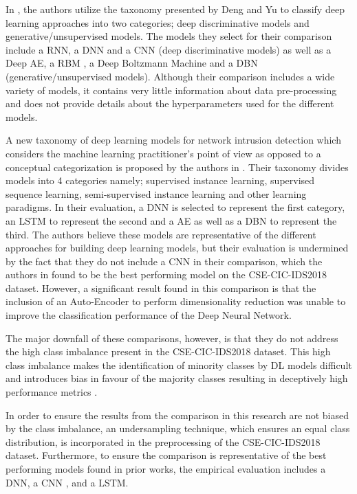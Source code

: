 \documentclass[conference]{IEEEtran}
\begin{document}
In \cite{b13}, the authors utilize the taxonomy presented by Deng and Yu \cite{b23} to classify deep learning approaches into two categories; deep discriminative models and generative/unsupervised models. The models they select for their comparison include a RNN, a DNN and a CNN (deep discriminative models) as well as a Deep AE, a RBM , a Deep Boltzmann Machine and a DBN (generative/unsupervised models). Although their comparison includes a wide variety of models, it contains very little information about data pre-processing and does not provide details about the hyperparameters used for the different models.

A new taxonomy of deep learning models for network intrusion detection which considers the machine learning practitioner’s point of view as opposed to a conceptual categorization is proposed by the authors in \cite{b14}. Their taxonomy divides models into 4 categories namely; supervised instance learning, supervised sequence learning, semi-supervised instance learning and other learning paradigms. In their evaluation, a DNN is selected to represent the first category, an LSTM to represent the second and a AE as well as a DBN to represent the third. The authors believe these models are representative of the different approaches for building deep learning models, but their evaluation is undermined by the fact that they do not include a CNN in their comparison, which the authors in \cite{b13} found to be the best performing model on the CSE-CIC-IDS2018 dataset. However, a significant result found in this comparison is that the inclusion of an Auto-Encoder
to perform dimensionality reduction was unable to improve the classification performance of the Deep Neural Network. 

The major downfall of these comparisons, however, is that they do not address the high class imbalance present in the CSE-CIC-IDS2018 dataset. This high class imbalance makes the identification of minority classes by DL models difficult and introduces bias in favour of the majority classes resulting in deceptively high performance metrics \cite{b17}. 

In order to ensure the results from the comparison in this research are not biased by the class imbalance, an undersampling technique, which ensures an equal class distribution, is incorporated in the preprocessing of the CSE-CIC-IDS2018 dataset. Furthermore, to ensure the comparison is representative of the best performing models found in prior works, the empirical evaluation includes a DNN, a CNN , and a LSTM. 
\end{document}

